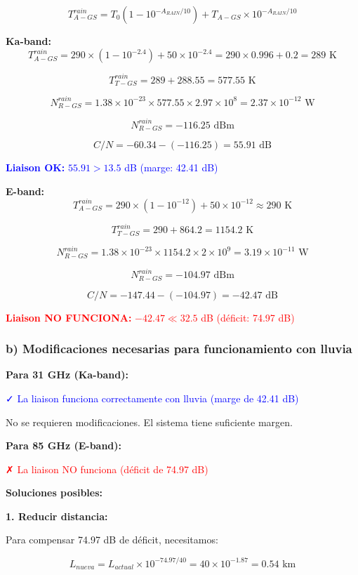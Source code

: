 \documentclass[12pt,a4paper]{extarticle}
\begin{document}
$$T_{A-GS}^{rain} = T_0 (1 - 10^{-A_{RAIN}/10}) + T_{A-GS} \times 10^{-A_{RAIN}/10}$$

\textbf{Ka-band:}
$$T_{A-GS}^{rain} = 290 \times (1 - 10^{-2.4}) + 50 \times 10^{-2.4} = 290 \times 0.996 + 0.2 = 289 \text{ K}$$

$$T_{T-GS}^{rain} = 289 + 288.55 = 577.55 \text{ K}$$

$$N_{R-GS}^{rain} = 1.38 \times 10^{-23} \times 577.55 \times 2.97 \times 10^8 = 2.37 \times 10^{-12} \text{ W}$$

$$N_{R-GS}^{rain} = -116.25 \text{ dBm}$$

$$C/N = -60.34 - (-116.25) = 55.91 \text{ dB}$$

\textcolor{blue}{\textbf{Liaison OK:} $55.91 > 13.5$ dB (marge: 42.41 dB)}

\textbf{E-band:}
$$T_{A-GS}^{rain} = 290 \times (1 - 10^{-12}) + 50 \times 10^{-12} \approx 290 \text{ K}$$

$$T_{T-GS}^{rain} = 290 + 864.2 = 1154.2 \text{ K}$$

$$N_{R-GS}^{rain} = 1.38 \times 10^{-23} \times 1154.2 \times 2 \times 10^9 = 3.19 \times 10^{-11} \text{ W}$$

$$N_{R-GS}^{rain} = -104.97 \text{ dBm}$$

$$C/N = -147.44 - (-104.97) = -42.47 \text{ dB}$$

\textcolor{red}{\textbf{Liaison NO FUNCIONA:} $-42.47 \ll 32.5$ dB (déficit: 74.97 dB)}

\subsubsection*{b) Modificaciones necesarias para funcionamiento con lluvia}

\textbf{Para 31 GHz (Ka-band):}

\textcolor{blue}{✓ La liaison funciona correctamente con lluvia (marge de 42.41 dB)}

No se requieren modificaciones. El sistema tiene suficiente margen.

\textbf{Para 85 GHz (E-band):}

\textcolor{red}{✗ La liaison NO funciona (déficit de 74.97 dB)}

\textbf{Soluciones posibles:}

\textbf{1. Reducir distancia:}

Para compensar 74.97 dB de déficit, necesitamos:

$$L_{nueva} = L_{actual} \times 10^{-74.97/40} = 40 \times 10^{-1.87} = 0.54 \text{ km}$$
\end{document}
